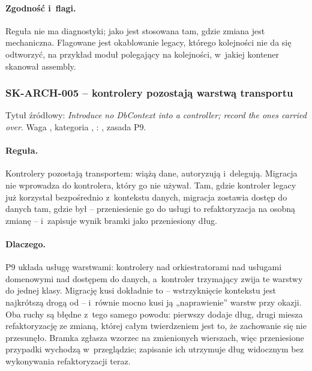 \paragraph{Zgodność i~flagi.} Reguła nie ma diagnostyki; jako  jest
stosowana tam, gdzie zmiana jest mechaniczna. Flagowane jest okablowanie legacy, którego
kolejności nie da się odtworzyć, na przykład moduł polegający na kolejności, w~jakiej
kontener skanował assembly.


\subsubsection{SK-ARCH-005 -- kontrolery pozostają warstwą transportu}\label{sec:standardy-sk-arch-005}

Tytuł źródłowy: \emph{Introduce no DbContext into a controller; record the ones carried
over}. Waga , kategoria , :
, zasada P9.

\paragraph{Reguła.} Kontrolery pozostają transportem: wiążą dane, autoryzują i~delegują.
Migracja nie wprowadza  do kontrolera, który go nie używał. Tam, gdzie
kontroler legacy już korzystał bezpośrednio z~kontekstu danych, migracja zostawia dostęp do
danych tam, gdzie był -- przeniesienie go do usługi to refaktoryzacja na osobną zmianę --
i~zapisuje wynik bramki jako przeniesiony dług.

\paragraph{Dlaczego.} P9 układa usługę warstwami: kontrolery nad orkiestratorami nad
usługami domenowymi nad dostępem do danych, a~kontroler trzymający 
zwija te warstwy do jednej klasy. Migrację kusi dokładnie to -- wstrzyknięcie kontekstu jest
najkrótszą drogą od  -- i~równie mocno kusi ją „naprawienie”
warstw przy okazji. Oba ruchy są błędne z~tego samego powodu: pierwszy dodaje dług, drugi
miesza refaktoryzację ze zmianą, której całym twierdzeniem jest to, że zachowanie się nie
przesunęło. Bramka zgłasza wzorzec na zmienionych wierszach, więc przeniesione przypadki
wychodzą w~przeglądzie; zapisanie ich utrzymuje dług widocznym bez wykonywania refaktoryzacji
teraz.

